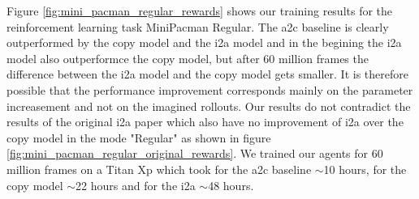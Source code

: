 Figure \ref{fig:mini_pacman_regular_rewards} shows our training results for the reinforcement learning task MiniPacman Regular.
The a2c baseline is clearly outperformed by the copy model and the i2a model and in the begining the i2a model also outperformce the copy model, but after 60 million frames the difference between the i2a model and the copy model gets smaller.
It is therefore possible that the performance improvement corresponds mainly on the parameter increasement and not on the imagined rollouts.
Our results do not contradict the results of the original i2a paper which also have no improvement of i2a over the copy model in the mode "Regular" as shown in figure \ref{fig:mini_pacman_regular_original_rewards}.
We trained our agents for 60 million frames on a Titan Xp which took for the a2c baseline $\sim$10 hours, for the copy model $\sim$22 hours and for the i2a $\sim$48 hours.


